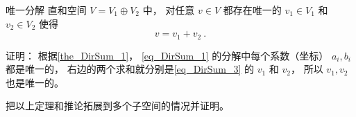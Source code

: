 \begin{theorem}{唯一分解}
直和空间 $V = V_1 \oplus V_2$ 中， 对任意 $v \in V$ 都存在唯一的 $v_1 \in V_1$ 和 $v_2 \in V_2$ 使得
\begin{equation}\label{eq_DirSum_3}
v = v_1 + v_2~.
\end{equation}
\end{theorem}
证明： 根据\autoref{the_DirSum_1}， \autoref{eq_DirSum_1} 的分解中每个系数（坐标） $a_i, b_i$ 都是唯一的， 右边的两个求和就分别是\autoref{eq_DirSum_3} 的 $v_1$ 和 $v_2$， 所以 $v_1, v_2$ 也是唯一的。

\begin{exercise}{}
把以上定理和推论拓展到多个子空间的情况并证明。
\end{exercise}

